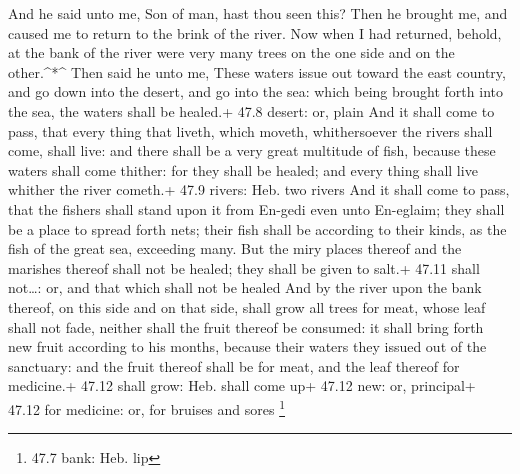  And he said unto me, Son of man, hast thou seen this? Then
he brought me, and caused me to return to the brink of the river.
 Now when I had returned, behold, at the bank of the river
were very many trees on the one side and on the other.\^{}*\^{}
 Then said he unto me, These waters issue out toward the
east country, and go down into the desert, and go into the sea: which
being brought forth into the sea, the waters shall be healed.+ 47.8
desert: or, plain  And it shall come to pass, that every
thing that liveth, which moveth, whithersoever the rivers shall come,
shall live: and there shall be a very great multitude of fish, because
these waters shall come thither: for they shall be healed; and every
thing shall live whither the river cometh.+ 47.9 rivers: Heb. two rivers
 And it shall come to pass, that the fishers shall stand
upon it from En-gedi even unto En-eglaim; they shall be a place to
spread forth nets; their fish shall be according to their kinds, as the
fish of the great sea, exceeding many.  But the miry places
thereof and the marishes thereof shall not be healed; they shall be
given to salt.+ 47.11 shall not\ldots: or, and that which shall not be
healed  And by the river upon the bank thereof, on this
side and on that side, shall grow all trees for meat, whose leaf shall
not fade, neither shall the fruit thereof be consumed: it shall bring
forth new fruit according to his months, because their waters they
issued out of the sanctuary: and the fruit thereof shall be for meat,
and the leaf thereof for medicine.+ 47.12 shall grow: Heb. shall come
up+ 47.12 new: or, principal+ 47.12 for medicine: or, for bruises and
sores \footnote{47.7 bank: Heb. lip}

